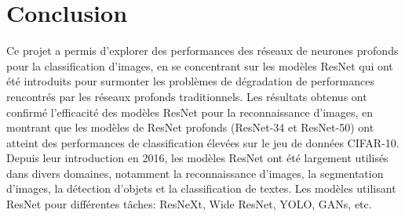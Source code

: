 \documentclass{article}
\begin{document}
\section{Conclusion}

Ce projet a permis d'explorer des performances des réseaux de neurones profonds pour la classification d'images,
en se concentrant sur les modèles ResNet qui ont été introduits pour surmonter les problèmes de dégradation de
performances rencontrés par les réseaux profonds traditionnels.
Les résultats obtenus ont confirmé l'efficacité des modèles ResNet pour la reconnaissance d'images, en montrant
que les modèles de ResNet profonds (ResNet-34 et ResNet-50) ont atteint des performances de classification élevées
sur le jeu de données CIFAR-10.
Depuis leur introduction en 2016, les modèles ResNet ont été largement utilisés dans divers domaines, notamment
la reconnaissance d'images, la segmentation d'images, la détection d'objets et la classification de textes.
Les modèles utilisant ResNet pour différentes tâches: ResNeXt, Wide ResNet, YOLO, GANs, etc.



\end{document}
